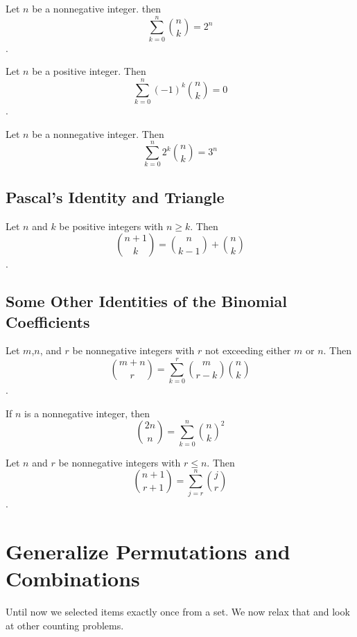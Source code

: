 \begin{corollary}
Let $n$ be a nonnegative integer. then
$$\sum_{k=0}^n {n\choose k} = 2^n$$.
\end{corollary}

\begin{corollary}
Let $n$ be a positive integer. Then
$$\sum_{k=0}^n (-1)^k {n \choose k} = 0$$.
\end{corollary}

\begin{corollary}
Let $n$ be a nonnegative integer. Then
$$ \sum_{k=0}^{n}2^k {n\choose k} = 3^n$$
\end{corollary}

\subsection{Pascal's Identity and Triangle}
\begin{theorem}
Let $n$ and $k$ be positive integers with $n \ge k$. Then
$$ {{n+1} \choose k}  = {n \choose {k-1}} + { n \choose k}$$.
\end{theorem}



    \subsection {Some Other Identities of the Binomial Coefficients}
\begin{theorem}
Let $m$,$n$, and $r$ be nonnegative integers with $r$ not exceeding either $m$ or $n$. Then 
$$ {{m+n} \choose r} = \sum_{k=0}^r {m\choose{r-k}} {n\choose k}$$.
\end{theorem}

\begin{corollary}
If $n$ is a nonnegative integer, then
$${ {2n}\choose n} = \sum_{k=0}^{n}  {n\choose k}^2$$
\end{corollary}

\begin{theorem}
Let $n$ and $r$ be nonnegative integers with $r \le n$. Then
$${ {n+1} \choose {r+1}} = \sum_{j=r}^n {j\choose r}$$.
\end{theorem}


\section {Generalize Permutations and Combinations}
Until now we selected items exactly once from a set. We now relax that and look at other counting problems.
